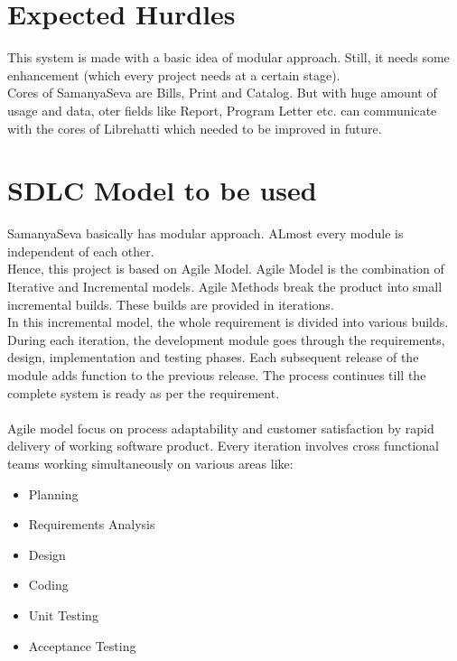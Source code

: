 \section{Expected Hurdles}
This system is made with a basic idea of modular approach. Still, it needs some enhancement (which every project needs at a certain stage).\\
Cores of SamanyaSeva are Bills, Print and Catalog. But with huge amount of usage and data, oter fields like Report, Program Letter etc. can communicate with the cores of Librehatti which needed to be improved in future.

\section{SDLC Model to be used}
SamanyaSeva basically has modular approach. ALmost every module is independent of each other.\\
Hence, this project is based on Agile Model. Agile Model is the combination of Iterative and Incremental models.
Agile Methods break the product into small incremental builds. These builds are provided in iterations.\\
In this incremental model, the whole requirement is divided into various builds. During each iteration, the development module goes through the requirements, design, implementation and testing phases. Each subsequent release of the module adds function to the previous release. The process continues till the complete system is ready as per the requirement.\\\\
Agile model focus on process adaptability and customer satisfaction by rapid delivery of working software product.
Every iteration involves cross functional teams working simultaneously on various areas like:
\begin{itemize}
	\item Planning
	\item Requirements Analysis
\item Design
\item Coding
\item Unit Testing 
\item Acceptance Testing
\end{itemize}